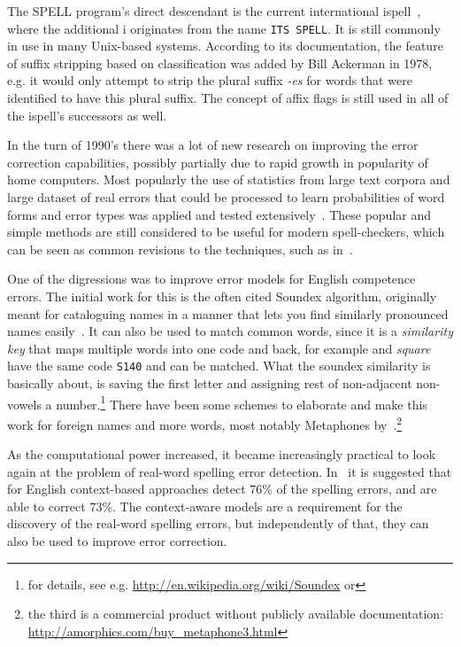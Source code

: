 \documentclass[officiallayout]{unihelcompling}
\newcommand\misspelt{\bgroup\markoverwith
{\textcolor{red}{\lower3.5pt\hbox{\sixly \char58}}}\ULon}
\begin{document}
The SPELL program's direct descendant is the current international
ispell~\citep{gorin1971spell}, where the additional i originates from the name
\texttt{ITS SPELL}. It is still commonly in use in many Unix-based systems.
According to its documentation, the feature of suffix stripping based on
classification was added by Bill Ackerman in 1978, e.g. it would only attempt
to strip the plural suffix \emph{-es} for words that were identified to have
this plural suffix.  The concept of affix flags is still used in all of the
ispell's successors as well.

In the turn of 1990's there was a lot of new research on improving the error
correction capabilities, possibly partially due to rapid growth in popularity
of home computers. Most popularly the use of statistics from large text corpora
and large dataset of real errors that could be processed to learn probabilities
of word forms and error types was applied and tested
extensively~\citep{kernighan1990spelling,church1991probability}. These popular
and simple methods are still considered to be useful for modern spell-checkers,
which can be seen as common revisions to the techniques, such as
in~\citet{brill2000improved}.

One of the digressions was to improve error models for English competence
errors. The initial work for this is the often cited Soundex algorithm,
originally meant for cataloguing names in a manner that lets you find similarly
pronounced names easily~\citep{russell1918soundex}. It can also be used to
match common words, since it is a \emph{similarity key} that maps multiple
words into one code and back, for example \misspelt{squer} and \emph{square}
have the same code \texttt{S140} and can be matched.
What the soundex similarity
is basically about, is saving the first letter and assigning rest of
non-adjacent non-vowels a number.\footnote{for details, see e.g. \url{http://en.wikipedia.org/wiki/Soundex} or } There have been some schemes to elaborate and
make this work for foreign names and more words, most notably Metaphones
by~\citet{philips1990hanging,philips2000double}.\footnote{the third is a
commercial product without publicly available documentation:
\url{http://amorphics.com/buy_metaphone3.html}}

As the computational power increased, it became increasingly practical to look
again at the problem of real-word spelling error detection.
In~\citet{mays1991context} it is suggested that for English context-based
approaches detect 76\% of the spelling errors, and are able to correct 73\%.
The context-aware models are a requirement for the discovery of the real-word
spelling errors, but independently of that, they can also be used to improve
error correction. 
\end{document}
